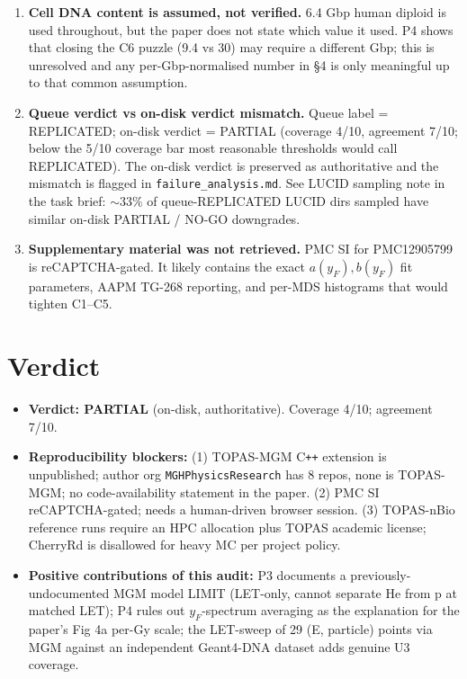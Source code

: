 \documentclass[11pt]{article}
\begin{document}
\begin{enumerate}
    (typically $\sim 50$ depths $\times$ 2 particles) is not
    reproduced. C9's factor-of-2 FAIL is left as a known gap.
  \item \textbf{Cell DNA content is assumed, not verified.} 6.4 Gbp
    human diploid is used throughout, but the paper does not state
    which value it used. P4 shows that closing the C6 puzzle (9.4 vs
    30) may require a different Gbp; this is unresolved and any
    per-Gbp-normalised number in \S 4 is only meaningful up to that
    common assumption.
  \item \textbf{Queue verdict vs on-disk verdict mismatch.} Queue
    label = REPLICATED; on-disk verdict = PARTIAL (coverage 4/10,
    agreement 7/10; below the 5/10 coverage bar most reasonable
    thresholds would call REPLICATED). The on-disk verdict is
    preserved as authoritative and the mismatch is flagged in
    \texttt{failure\_analysis.md}. See LUCID sampling note in the
    task brief: $\sim 33\%$ of queue-REPLICATED LUCID dirs sampled
    have similar on-disk PARTIAL / NO-GO downgrades.
  \item \textbf{Supplementary material was not retrieved.} PMC SI
    for PMC12905799 is reCAPTCHA-gated. It likely contains the
    exact $a(y_F), b(y_F)$ fit parameters, AAPM TG-268 reporting,
    and per-MDS histograms that would tighten C1--C5.
\end{enumerate}

\section{Verdict}
\begin{itemize}
  \item \textbf{Verdict: PARTIAL} (on-disk, authoritative). Coverage 4/10;
    agreement 7/10.
  \item \textbf{Reproducibility blockers:}
    (1) TOPAS-MGM C\texttt{++} extension is unpublished; author org
    \texttt{MGHPhysicsResearch} has 8 repos, none is TOPAS-MGM;
    no code-availability statement in the paper.
    (2) PMC SI reCAPTCHA-gated; needs a human-driven browser session.
    (3) TOPAS-nBio reference runs require an HPC allocation plus TOPAS
    academic license; CherryRd is disallowed for heavy MC per project policy.
  \item \textbf{Positive contributions of this audit:}
    P3 documents a previously-undocumented MGM model LIMIT
    (LET-only, cannot separate He from p at matched LET);
    P4 rules out $y_F$-spectrum averaging as the explanation for the
    paper's Fig 4a per-Gy scale;
    the LET-sweep of 29 (E, particle) points via MGM against an
    independent Geant4-DNA dataset adds genuine U3 coverage.
\end{itemize}


\end{document}
